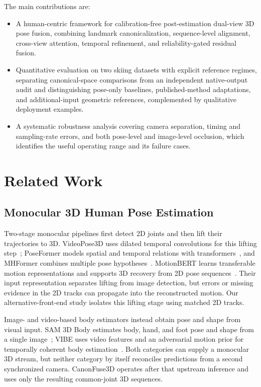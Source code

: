 \documentclass[preprint,12pt]{elsarticle}
\begin{document}
The main contributions are:
\begin{itemize}
    \item A human-centric framework for calibration-free post-estimation dual-view 3D pose fusion, combining landmark canonicalization, sequence-level alignment, cross-view attention, temporal refinement, and reliability-gated residual fusion.
    \item Quantitative evaluation on two skiing datasets with explicit reference regimes, separating canonical-space comparisons from an independent native-output audit and distinguishing pose-only baselines, published-method adaptations, and additional-input geometric references, complemented by qualitative deployment examples.
    \item A systematic robustness analysis covering camera separation, timing and sampling-rate errors, and both pose-level and image-level occlusion, which identifies the useful operating range and its failure cases.
\end{itemize}

\section{Related Work}
\label{sec:related_work}

\subsection{Monocular 3D Human Pose Estimation}
Two-stage monocular pipelines first detect 2D joints and then lift their trajectories to 3D. VideoPose3D uses dilated temporal convolutions for this lifting step~\cite{pavllo2019videopose3d}; PoseFormer models spatial and temporal relations with transformers~\cite{zheng2021poseformer}, and MHFormer combines multiple pose hypotheses~\cite{li2022mhformer}. MotionBERT learns transferable motion representations and supports 3D recovery from 2D pose sequences~\cite{zhu2023motionbert}. Their input representation separates lifting from image detection, but errors or missing evidence in the 2D tracks can propagate into the reconstructed motion. Our alternative-front-end study isolates this lifting stage using matched 2D tracks.

Image- and video-based body estimators instead obtain pose and shape from visual input. SAM 3D Body estimates body, hand, and foot pose and shape from a single image~\cite{yang2026sam}; VIBE uses video features and an adversarial motion prior for temporally coherent body estimation~\cite{kocabas2020vibe}. Both categories can supply a monocular 3D stream, but neither category by itself reconciles predictions from a second synchronized camera. CanonFuse3D operates after that upstream inference and uses only the resulting common-joint 3D sequences.
\end{document}

